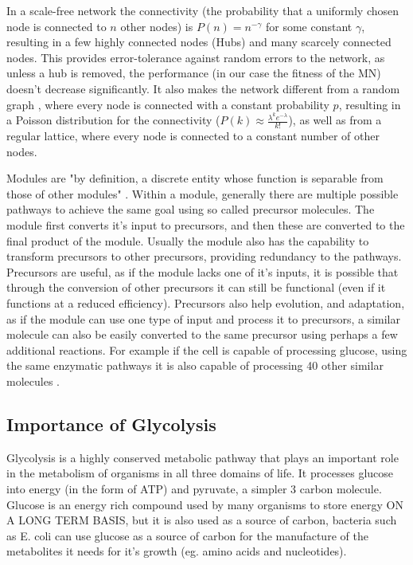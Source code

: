 \documentclass[10pt,a4paper]{article}
\begin{document}
	In a scale-free network the connectivity (the probability that a uniformly chosen node is connected to $n$ other nodes) is $P(n)=n^{-\gamma}$ for some constant $\gamma$, resulting in a few highly connected nodes (Hubs) and many scarcely connected nodes. This provides error-tolerance against random errors to the network, as unless a hub is removed, the performance (in our case the fitness of the MN) doesn't decrease significantly. It also makes the network different from a random graph \cite{randomgraphs}, where every node is connected with a constant probability $p$, resulting in a Poisson distribution for the connectivity ($P(k) \approx \frac{\lambda^k e^{-\lambda}}{k!} $), as well as from a regular lattice, where every node is connected to a constant number of other nodes.
	  
	Modules are "by definition, a discrete entity whose function is separable from those of other modules" \cite{modulardef}. Within a module, generally there are multiple possible pathways to achieve the same goal using so called precursor molecules. The module first converts it's input to precursors, and then these are converted to the final product of the module. Usually the module also has the capability to transform precursors to other precursors, providing redundancy to the pathways. Precursors are useful, as if the module lacks one of it's inputs, it is possible that through the conversion of other precursors it can still be functional (even if it functions at a reduced efficiency). Precursors also help evolution, and adaptation, as if the module can use one type of input and process it to precursors, a similar molecule can also be easily converted to the same precursor using perhaps a few additional reactions. For example if the cell is capable of processing glucose, using the same enzymatic pathways it is also capable of processing 40 other similar molecules \cite{latent}.
	
\subsection{Importance of Glycolysis}
\label{sub:importance_of_glycolysis}

Glycolysis is a highly conserved metabolic pathway that plays an important role in the metabolism of organisms in all three domains of life. It processes glucose into energy (in the form of ATP) and pyruvate, a simpler 3 carbon molecule. Glucose is an energy rich compound used by many organisms to store energy ON A LONG TERM BASIS, but it is also used as a source of carbon, bacteria such as E. coli can use glucose as a source of carbon for the manufacture of the metabolites it needs for it's growth (eg. amino acids and nucleotides). \cite[]{principlesofbio} 
\end{document}
